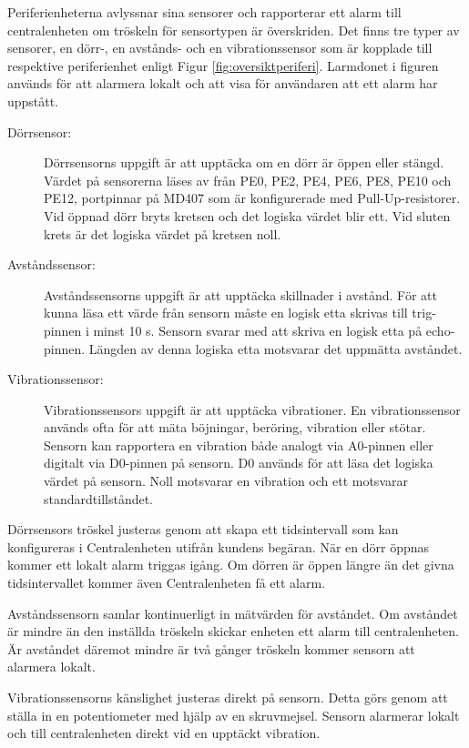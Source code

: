 \documentclass[a4paper]{article}
\begin{document}
Periferienheterna avlyssnar sina sensorer och rapporterar ett alarm till centralenheten om tröskeln för sensortypen är överskriden.
Det finns tre typer av sensorer, en dörr-, en avstånds- och en vibrationssensor som är kopplade till respektive periferienhet enligt Figur \ref{fig:oversiktperiferi}.
Larmdonet i figuren används för att alarmera lokalt och att visa för användaren att ett alarm har uppstått.

\begin{description}
    \item[Dörrsensor:] Dörrsensorns uppgift är att upptäcka om en dörr är öppen eller stängd.
    Värdet på sensorerna läses av från PE0, PE2, PE4, PE6, PE8, PE10 och PE12, portpinnar på MD407 som är konfigurerade med Pull-Up-resistorer.
    Vid öppnad dörr bryts kretsen och det logiska värdet blir ett.
    Vid sluten krets är det logiska värdet på kretsen noll.

    \item[Avståndssensor:] Avståndssensorns uppgift är att upptäcka skillnader i avstånd.
    För att kunna läsa ett värde från sensorn måste en logisk etta skrivas till trig-pinnen i minst 10 \textmu s.
    Sensorn svarar med att skriva en logisk etta på echo-pinnen.
    Längden av denna logiska etta motsvarar det uppmätta avståndet.

    \item[Vibrationssensor:] Vibrationssensors uppgift är att upptäcka vibrationer.
    En vibrationssensor används ofta för att mäta böjningar, beröring, vibration eller stötar.
    Sensorn kan rapportera en vibration både analogt via A0-pinnen eller digitalt via D0-pinnen på sensorn.
    D0 används för att läsa det logiska värdet på sensorn.
    Noll motsvarar en vibration och ett motsvarar standardtillståndet.
\end{description}

Dörrsensors tröskel justeras genom att skapa ett tidsintervall som kan konfigureras i Centralenheten utifrån kundens begäran.
När en dörr öppnas kommer ett lokalt alarm triggas igång.
Om dörren är öppen längre än det givna tidsintervallet kommer även Centralenheten få ett alarm.

Avståndssensorn samlar kontinuerligt in mätvärden för avståndet.
Om avståndet är mindre än den inställda tröskeln skickar enheten ett alarm till centralenheten.
Är avståndet däremot mindre är två gånger tröskeln kommer sensorn att alarmera lokalt.

Vibrationssensorns känslighet justeras direkt på sensorn.
Detta görs genom att ställa in en potentiometer med hjälp av en skruvmejsel.
Sensorn alarmerar lokalt och till centralenheten direkt vid en upptäckt vibration.
\end{document}
